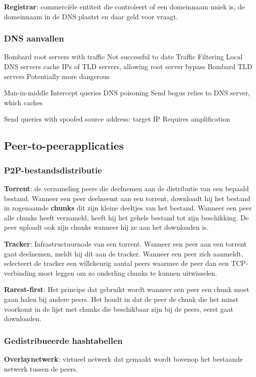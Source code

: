 
\textbf{Registrar}: commerciële entiteit die controleert of een domeinnaam uniek is, de domeinnaam in de DNS plaatst en daar geld voor vraagt.

\clearpage

\subsubsection{DNS aanvallen}


\bi
\itf Bombard root servers with traffic
    \bi
    \itf Not successful to date
    \itf Traffic Filtering
    \itf Local DNS servers cache IPs of TLD servers, allowing root server bypass
    \ei
\itf Bombard TLD servers
    \bi
\itf Potentially more dangerous
    \ei
\ei


\bi
\itf Man-in-middle
    \bi
    \itf Intercept queries
    \ei
\itf DNS poisoning
    \bi
    \itf Send bogus relies to DNS server, which caches
    \ei
\ei


\bi
\itf Send queries with spoofed source address: target IP
\itf Requires amplification
\ei

\subsection{Peer-to-peerapplicaties}

\subsubsection{P2P-bestandsdistributie}

\textbf{Torrent}: de verzameling peers die deelnemen aan de distributie van een bepaald bestand. Wanneer een peer deelneemt aan een torrent, downloadt hij het bestand in zogenaamde \textbf{chunks} dit zijn kleine deeltjes van het bestand. Wanneer een peer alle chunks heeft verzameld, heeft hij het gehele bestand tot zijn beschikking. De peer uploadt ook zijn chunks wanneer hij ze aan het downloaden is.

\textbf{Tracker}: Infrastructuurnode van een torrent. Wanneer een peer aan een torrent gaat deelnemen, meldt hij dit aan de tracker. Wanneer een peer zich aanmeldt, selecteert de tracker een willekeurig aantal peers waarmee de peer dan een TCP-verbinding moet leggen om zo onderling chunks te kunnen uitwisselen.

\textbf{Rarest-first}: Het principe dat gebruikt wordt wanneer een peer een chunk moet gaan halen bij andere peers. Het houdt in dat de peer de chunk die het minst voorkomt in de lijst met chunks die beschikbaar zijn bij de peers, eerst gaat downloaden.

\subsubsection{Gedistribueerde hashtabellen}

\textbf{Overlaynetwerk}: virtueel netwerk dat gemaakt wordt bovenop het bestaande netwerk tussen de peers.